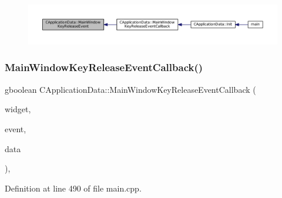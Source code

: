 \nopagebreak
\begin{figure}[H]
\begin{center}
\leavevmode
\includegraphics[width=350pt]{classCApplicationData_aff9f46bccd458a0dcca968e4a46c7d9b_icgraph}
\end{center}
\end{figure}
\hypertarget{classCApplicationData_a4b2c76db5c2efd75404502e36700f99b}{}\label{classCApplicationData_a4b2c76db5c2efd75404502e36700f99b} 
\subsubsection{\texorpdfstring{Main\+Window\+Key\+Release\+Event\+Callback()}{MainWindowKeyReleaseEventCallback()}}
{\footnotesize\ttfamily gboolean C\+Application\+Data\+::\+Main\+Window\+Key\+Release\+Event\+Callback (\begin{DoxyParamCaption}\item[{Gtk\+Widget $\ast$}]{widget,  }\item[{Gdk\+Event\+Key $\ast$}]{event,  }\item[{gpointer}]{data }\end{DoxyParamCaption})\hspace{0.3cm}{\ttfamily [static]}, {\ttfamily [protected]}}



Definition at line 490 of file main.\+cpp.


